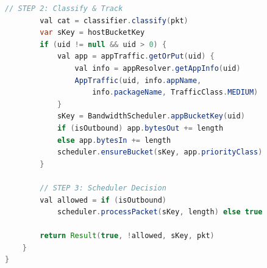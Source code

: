 \begin{lstlisting}[language=Java, caption={DataPlaneProcessor.kt --- Pipeline orchestrator}, label={lst:dataplane}]
        // STEP 2: Classify & Track
        val cat = classifier.classify(pkt)
        var sKey = hostBucketKey
        if (uid != null && uid > 0) {
            val app = appTraffic.getOrPut(uid) {
                val info = appResolver.getAppInfo(uid)
                AppTraffic(uid, info.appName,
                    info.packageName, TrafficClass.MEDIUM)
            }
            sKey = BandwidthScheduler.appBucketKey(uid)
            if (isOutbound) app.bytesOut += length
            else app.bytesIn += length
            scheduler.ensureBucket(sKey, app.priorityClass)
        }

        // STEP 3: Scheduler Decision
        val allowed = if (isOutbound)
            scheduler.processPacket(sKey, length) else true

        return Result(true, !allowed, sKey, pkt)
    }
}
\end{lstlisting}
